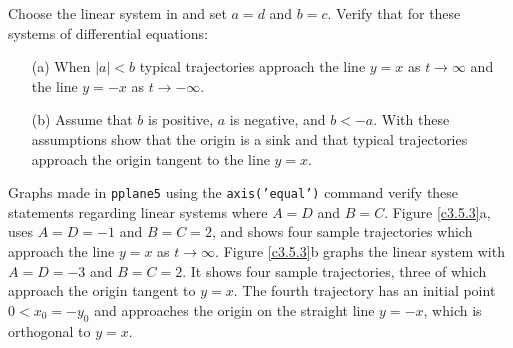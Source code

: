 \documentclass{ximera}
\begin{document}
\begin{exercise} \label{c3.5.3}
Choose the {\sf linear system} in {\pplane} and set
$a=d$ and $b=c$.  Verify that for these systems of differential
equations:
\begin{itemize}
\item[(a)]  When $|a|<b$ typical trajectories approach the line
$y=x$ as $t\to\infty$ and the line $y=-x$ as $t\to -\infty$.
\item[(b)]  Assume that $b$ is positive, $a$ is negative, and $b<-a$. 
With these assumptions show that the origin is a sink and that typical 
trajectories approach the origin tangent to the line $y=x$.
\end{itemize}

\begin{solution}

Graphs made in {\tt pplane5} using the {\tt axis('equal')} command
verify these statements regarding linear systems where $A = D$
and $B = C$.  Figure \ref{c3.5.3}a, uses $A = D = -1$ and
$B = C = 2$, and shows four sample trajectories which approach
the line $y = x$ as $t \rightarrow \infty$.  Figure
\ref{c3.5.3}b graphs the linear system with $A = D = -3$
and $B = C = 2$.  It shows four sample trajectories, three of
which approach the origin tangent to $y = x$.  The fourth
trajectory has an initial point $0 < x_0 = -y_0$ and approaches
the origin on the straight line $y = -x$, which is orthogonal
to $y = x$.
\begin{figure}[htb]
                       \centerline{%
                       }
\end{figure}

\end{solution}
\end{exercise}
\end{document}
